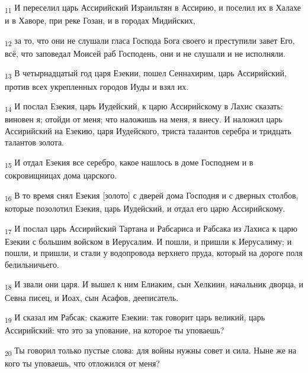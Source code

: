 \begin{tcolorbox}
\textsubscript{11} И переселил царь Ассирийский Израильтян в Ассирию, и поселил их в Халахе и в Хаворе, при реке Гозан, и в городах Мидийских,
\end{tcolorbox}
\begin{tcolorbox}
\textsubscript{12} за то, что они не слушали гласа Господа Бога своего и преступили завет Его, всё, что заповедал Моисей раб Господень, они и не слушали и не исполняли.
\end{tcolorbox}
\begin{tcolorbox}
\textsubscript{13} В четырнадцатый год царя Езекии, пошел Сеннахирим, царь Ассирийский, против всех укрепленных городов Иуды и взял их.
\end{tcolorbox}
\begin{tcolorbox}
\textsubscript{14} И послал Езекия, царь Иудейский, к царю Ассирийскому в Лахис сказать: виновен я; отойди от меня; что наложишь на меня, я внесу. И наложил царь Ассирийский на Езекию, царя Иудейского, триста талантов серебра и тридцать талантов золота.
\end{tcolorbox}
\begin{tcolorbox}
\textsubscript{15} И отдал Езекия все серебро, какое нашлось в доме Господнем и в сокровищницах дома царского.
\end{tcolorbox}
\begin{tcolorbox}
\textsubscript{16} В то время снял Езекия [золото] с дверей дома Господня и с дверных столбов, которые позолотил Езекия, царь Иудейский, и отдал его царю Ассирийскому.
\end{tcolorbox}
\begin{tcolorbox}
\textsubscript{17} И послал царь Ассирийский Тартана и Рабсариса и Рабсака из Лахиса к царю Езекии с большим войском в Иерусалим. И пошли, и пришли к Иерусалиму; и пошли, и пришли, и стали у водопровода верхнего пруда, который на дороге поля белильничьего.
\end{tcolorbox}
\begin{tcolorbox}
\textsubscript{18} И звали они царя. И вышел к ним Елиаким, сын Хелкиин, начальник дворца, и Севна писец, и Иоах, сын Асафов, дееписатель.
\end{tcolorbox}
\begin{tcolorbox}
\textsubscript{19} И сказал им Рабсак: скажите Езекии: так говорит царь великий, царь Ассирийский: что это за упование, на которое ты уповаешь?
\end{tcolorbox}
\begin{tcolorbox}
\textsubscript{20} Ты говорил только пустые слова: для войны нужны совет и сила. Ныне же на кого ты уповаешь, что отложился от меня?
\end{tcolorbox}
